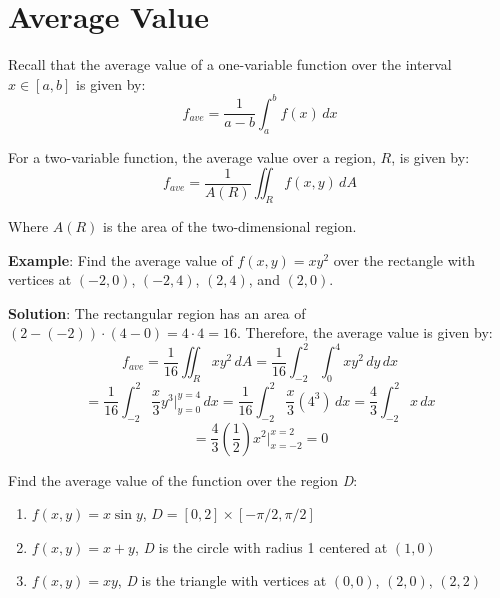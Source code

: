 \section{Average Value}
Recall that the average value of a one-variable function over the interval $x 
\in [a, b]$ is given by:
$$f_{ave} = \frac{1}{a - b}\int_a^b f(x)\,dx$$

For a two-variable function, the average value over a region, $R$, is given by:
$$f_{ave} = \frac{1}{A(R)} \iint_{R} f(x, y)\,dA$$

Where $A(R)$ is the area of the two-dimensional region. 

\textbf{Example}: Find the average value of $f(x, y) = xy^2$ over the rectangle
with vertices at $(-2, 0)$, $(-2, 4)$, $(2, 4)$, and $(2, 0)$. 

\textbf{Solution}: The rectangular region has an area of $(2 - (-2)) \cdot (4 -
0) = 4 \cdot 4 = 16$. Therefore, the average value is given by:
$$f_{ave} = \frac{1}{16} \iint_{R} xy^2\,dA = \frac{1}{16} \int_{-2}^2 \int_0^4
xy^2\,dy\,dx$$
$$= \frac{1}{16} \int_{-2}^2 \frac{x}{3} y^3|_{y = 0}^{y = 4}\,dx = \frac{1}{
16} \int_{-2}^2 \frac{x}{3} \left(4^3 \right)\,dx = \frac{4}{3} \int_{-2}^2 x\,
dx$$
$$= \frac{4}{3} \left( \frac{1}{2} \right) x^2|_{x = -2}^{x = 2} = 0$$

\begin{Exercise}[title = {Average Value}, label = avg]
Find the average value of the function over the region \textit{D}:
\begin{enumerate}
\item $f(x, y) = x\sin{y}$, $\textit{D} = [0, 2] \times [-\pi/2, \pi/2]$
\item $f(x, y) = x + y$, \textit{D} is the circle with radius 1 centered at 
$(1, 0)$
\item $f(x, y) = xy$, \textit{D} is the triangle with vertices at $(0, 0)$, 
$(2, 0)$, $(2, 2)$
\end{enumerate}
\vspace{70mm}
\end{Exercise}

